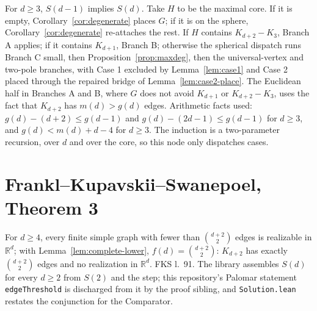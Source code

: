 \begin{lemma}
  \label{lem:step}
  \leanok
  For $d \ge 3$, $S(d-1)$ implies $S(d)$. Take $H$ to be the maximal core. If it is empty,
  Corollary~\ref{cor:degenerate} places $G$; if it is on the sphere,
  Corollary~\ref{cor:degenerate} re-attaches the rest. If $H$ contains $K_{d+2} - K_3$,
  Branch A applies; if it contains $K_{d+1}$, Branch B; otherwise the spherical dispatch runs
  Branch C small, then Proposition~\ref{prop:maxdeg}, then the universal-vertex and two-pole
  branches, with Case 1 excluded by Lemma~\ref{lem:case1} and Case 2 placed through the
  repaired bridge of Lemma~\ref{lem:case2-place}. The Euclidean half in Branches A and B,
  where $G$ does not avoid $K_{d+1}$ or $K_{d+2} - K_3$, uses the fact that $K_{d+2}$ has
  $m(d) > g(d)$ edges. Arithmetic facts used: $g(d) - (d + 2) \le g(d-1)$ and
  $g(d) - (2d - 1) \le g(d-1)$ for $d \ge 3$, and $g(d) < m(d) + d - 4$ for $d \ge 3$. The
  induction is a two-parameter recursion, over $d$ and over the core, so this node only
  dispatches cases.
\end{lemma}

\section{Frankl--Kupavskii--Swanepoel, Theorem 3}

\begin{theorem}
  \label{thm:fks}
  \leanok
  For $d \ge 4$, every finite simple graph with fewer than $\binom{d+2}{2}$ edges is
  realizable in $\mathbb{R}^d$; with Lemma~\ref{lem:complete-lower}, $f(d) = \binom{d+2}{2}$:
  $K_{d+2}$ has exactly $\binom{d+2}{2}$ edges and no realization in $\mathbb{R}^d$. FKS
  l.~91. The library assembles $S(d)$ for every $d \ge 2$ from $S(2)$ and the step; this
  repository's Palomar statement \texttt{edgeThreshold} is discharged from it by the proof
  sibling, and \texttt{Solution.lean} restates the conjunction for the Comparator.
\end{theorem}
